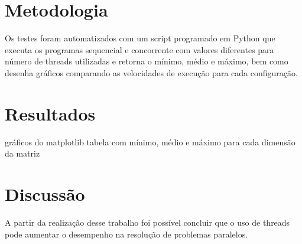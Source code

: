 \documentclass[12pt, a4paper]{article}
\begin{document}
\section{Metodologia}
Os testes foram automatizados com um script programado em Python que executa os
programas sequencial e concorrente com valores diferentes para número de
threads utilizadas e retorna o mínimo, médio e máximo, bem como desenha gráficos
comparando as velocidades de execução para cada configuração.

\section{Resultados}
gráficos do matplotlib
tabela com mínimo, médio e máximo para cada dimensão da matriz

\section{Discussão}
A partir da realização desse trabalho foi possível concluir que o uso de
threads pode aumentar o desempenho na resolução de problemas paralelos.
\end{document}
